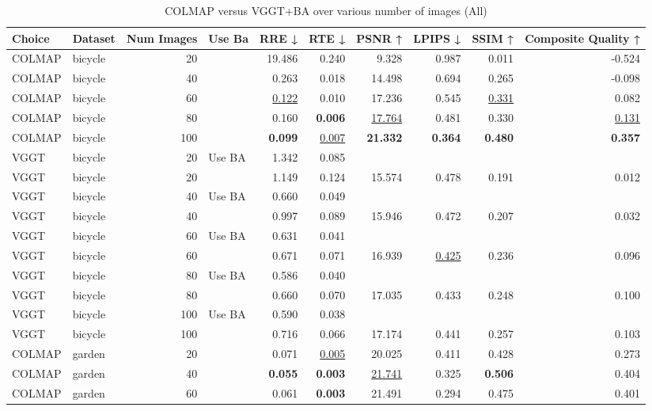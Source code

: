 \begin{table}[H]
\caption{COLMAP versus VGGT+BA over various number of images (All)}
\label{tab:01_num_images_use_ba_all}
\small
\begin{tabular}{llrlrrrrrr}
\toprule
Choice & Dataset & Num Images & Use Ba & RRE ↓ & RTE ↓ & PSNR ↑ & LPIPS ↓ & SSIM ↑ & Composite Quality ↑ \\
\midrule
COLMAP & bicycle & 20 &  & 19.486 & 0.240 & 9.328 & 0.987 & 0.011 & -0.524 \\
COLMAP & bicycle & 40 &  & 0.263 & 0.018 & 14.498 & 0.694 & 0.265 & -0.098 \\
COLMAP & bicycle & 60 &  & \underline{0.122} & 0.010 & 17.236 & 0.545 & \underline{0.331} & 0.082 \\
COLMAP & bicycle & 80 &  & 0.160 & \textbf{0.006} & \underline{17.764} & 0.481 & 0.330 & \underline{0.131} \\
COLMAP & bicycle & 100 &  & \textbf{0.099} & \underline{0.007} & \textbf{21.332} & \textbf{0.364} & \textbf{0.480} & \textbf{0.357} \\
VGGT & bicycle & 20 & Use BA & 1.342 & 0.085 &  &  &  &  \\
VGGT & bicycle & 20 &  & 1.149 & 0.124 & 15.574 & 0.478 & 0.191 & 0.012 \\
VGGT & bicycle & 40 & Use BA & 0.660 & 0.049 &  &  &  &  \\
VGGT & bicycle & 40 &  & 0.997 & 0.089 & 15.946 & 0.472 & 0.207 & 0.032 \\
VGGT & bicycle & 60 & Use BA & 0.631 & 0.041 &  &  &  &  \\
VGGT & bicycle & 60 &  & 0.671 & 0.071 & 16.939 & \underline{0.425} & 0.236 & 0.096 \\
VGGT & bicycle & 80 & Use BA & 0.586 & 0.040 &  &  &  &  \\
VGGT & bicycle & 80 &  & 0.660 & 0.070 & 17.035 & 0.433 & 0.248 & 0.100 \\
VGGT & bicycle & 100 & Use BA & 0.590 & 0.038 &  &  &  &  \\
VGGT & bicycle & 100 &  & 0.716 & 0.066 & 17.174 & 0.441 & 0.257 & 0.103 \\
\midrule
COLMAP & garden & 20 &  & 0.071 & \underline{0.005} & 20.025 & 0.411 & 0.428 & 0.273 \\
COLMAP & garden & 40 &  & \textbf{0.055} & \textbf{0.003} & \underline{21.741} & 0.325 & \textbf{0.506} & 0.404 \\
COLMAP & garden & 60 &  & 0.061 & \textbf{0.003} & 21.491 & 0.294 & 0.475 & 0.401 \\

\end{tabular}
\end{table}
